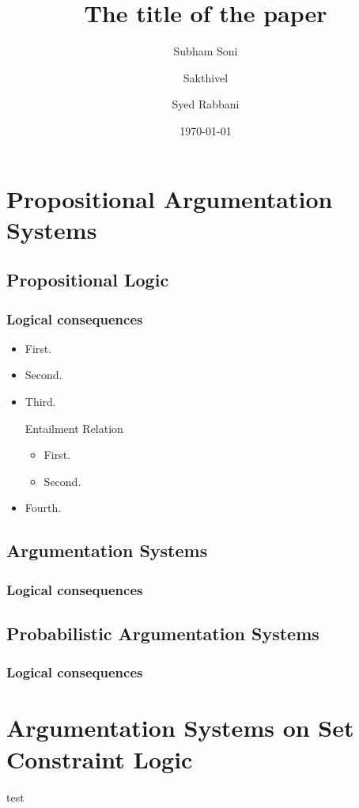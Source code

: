 \documentclass[12pt]{beamer}
\title{The title of the paper}
\author{Subham Soni \and Sakthivel \and Syed Rabbani}
\date{\today}
\begin{document}
\begin{frame}
\maketitle
\end{frame}

\section{Propositional Argumentation Systems}
\subsection{Propositional Logic}
\begin{frame}
\frametitle{Logical consequences}
\begin{itemize}
\item First.
\item Second.
\item Third.
\begin{exampleblock}{Entailment Relation}
\begin{itemize}
\item First.
\item Second.
\end{itemize}
\end{exampleblock}
\item Fourth.
\end{itemize}
\end{frame}

\subsection{Argumentation Systems}
\begin{frame}
\frametitle{Logical consequences}
\end{frame}
\subsection{Probabilistic Argumentation Systems}
\begin{frame}
\frametitle{Logical consequences}
\end{frame}

\section{Argumentation Systems on Set Constraint Logic}
\begin{frame}
test
\end{frame}
\end{document}
